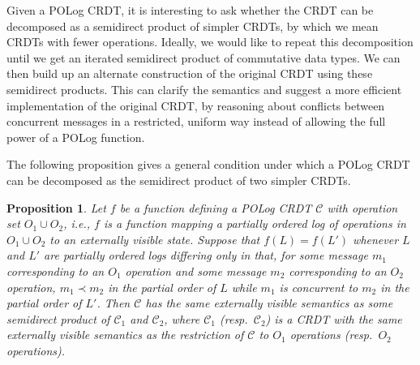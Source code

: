 \documentclass[acmsmall,nonacm,12pt]{acmart}
\newcommand{\mc}[1]{\ensuremath{\mathcal{#1}}}
\theoremstyle{plain}
\newtheorem{myprop}[mythm]{Proposition}
\theoremstyle{definition}
\begin{document}
Given a POLog CRDT, it is interesting to ask whether the CRDT can be decomposed as a semidirect product of simpler CRDTs, by which we mean CRDTs with fewer operations.  Ideally, we would like to repeat this decomposition until we get an iterated semidirect product of commutative data types.  We can then build up an alternate construction of the original CRDT using these semidirect products.  This can clarify the semantics and suggest a more efficient implementation of the original CRDT, by reasoning about conflicts between concurrent messages in a restricted, uniform way instead of allowing the full power of a POLog function.

The following proposition gives a general condition under which a POLog CRDT can be decomposed as the semidirect product of two simpler CRDTs.
\begin{myprop}
Let $f$ be a function defining a POLog CRDT $\mc{C}$ with operation set $O_1 \cup O_2$, i.e., $f$ is a function mapping a partially ordered log of operations in $O_1 \cup O_2$ to an externally visible state.  Suppose that $f(L) = f(L')$ whenever $L$ and $L'$ are partially ordered logs differing only in that, for some message $m_1$ corresponding to an $O_1$ operation and some message $m_2$ corresponding to an $O_2$ operation, $m_1 \prec m_2$ in the partial order of $L$ while $m_1$ is concurrent to $m_2$ in the partial order of $L'$.  Then $\mc{C}$ has the same externally visible semantics as some semidirect product of $\mc{C}_1$ and $\mc{C}_2$, where $\mc{C}_1$ (resp.\ $\mc{C}_2$) is a CRDT with the same externally visible semantics as the restriction of $\mc{C}$ to $O_1$ operations (resp.\ $O_2$ operations).
\end{myprop}
\end{document}
